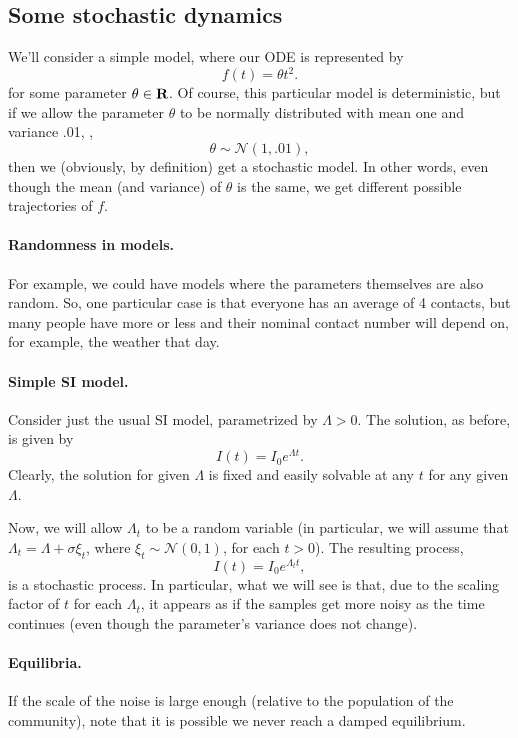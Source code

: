 \documentclass[12pt]{article}
\begin{document}
\subsection{Some stochastic dynamics}
We'll consider a simple model, where our ODE is represented by
\[
f(t) = \theta t^2.
\]
for some parameter $\theta \in {\mbox{\bf R}}$.
Of course, this particular model is deterministic, but if we allow the parameter $\theta$ to be normally distributed with mean one and variance .01, \ie,
\[
\theta\sim \mathcal{N}(1, .01),
\]
then we (obviously, by definition) get a stochastic model. In other words, even though the mean (and variance) of $\theta$ is the same, we get different possible
trajectories of $f$.

\paragraph{Randomness in models.} For example, we could have models where the parameters themselves are also random. So, one particular case is that everyone has an average of 4 contacts, but many people have more or less and their nominal contact number will depend on, for example, the weather that day.


\paragraph{Simple SI model.} Consider just the usual SI model, parametrized by $\Lambda > 0$. The solution, as before, is given by
\[
I(t) = I_0e^{\Lambda t}.
\]
Clearly, the solution for given $\Lambda$ is fixed and easily solvable at any $t$ for any given $\Lambda$.

Now, we will allow $\Lambda_t$ to be a random variable (in particular, we will assume that $\Lambda_t = \Lambda + \sigma\xi_t$, where $\xi_t \sim \mathcal{N}(0, 1)$,
for each $t > 0$). The resulting process,
\[
I(t) = I_0e^{\Lambda_t t},
\]
is a stochastic process. In particular, what we will see is that, due to the scaling factor of $t$ for each $\Lambda_t$, it appears as if the samples get more noisy as the time continues (even though the parameter's variance does not change).

\paragraph{Equilibria.} If the scale of the noise is large enough (relative to the population of the community), note that it is possible we never reach a damped equilibrium.
\end{document}
